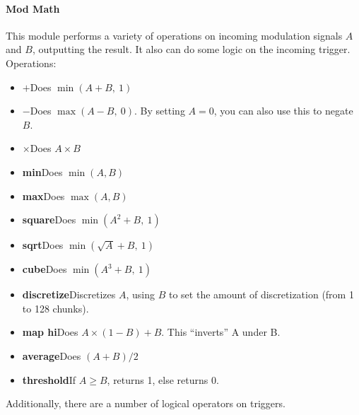 \documentclass{article}
\begin{document}
\paragraph{Mod Math}  This module performs a variety of operations on incoming modulation signals \(A\) and \(B\), outputting the result.  It also can do some logic on the incoming trigger.  Operations:

\begin{itemize}
\item \(\boldsymbol{+}\)\quad Does \(\min(A + B,\ 1)\)
\item \(\boldsymbol -\)\quad Does \(\max(A - B,\ 0)\).  By setting \(A=0\), you can also use this to negate \(B\).
\item \(\boldsymbol \times\)\quad Does \(A \times B\)
\item {\bf min}\quad Does \(\min(A, B)\)
\item {\bf max}\quad Does \(\max(A, B)\)
\item {\bf square}\quad Does \(\min(A^2 + B,\ 1)\)
\item {\bf sqrt}\quad Does \(\min(\sqrt{A} + B,\ 1)\)
\item {\bf cube}\quad Does \(\min(A^3 + B,\ 1)\)
\item {\bf discretize}\quad Discretizes \(A\), using \(B\) to set the amount of discretization (from 1 to 128 chunks).
\item {\bf map hi}\quad Does \(A \times (1-B) + B\).  This ``inverts'' A under B.
\item {\bf average}\quad Does \((A + B) / 2\)
\item {\bf threshold}\quad If \(A \geq B\), returns 1, else returns 0.
\end{itemize}

\noindent Additionally, there are a number of logical operators on triggers.
\end{document}
